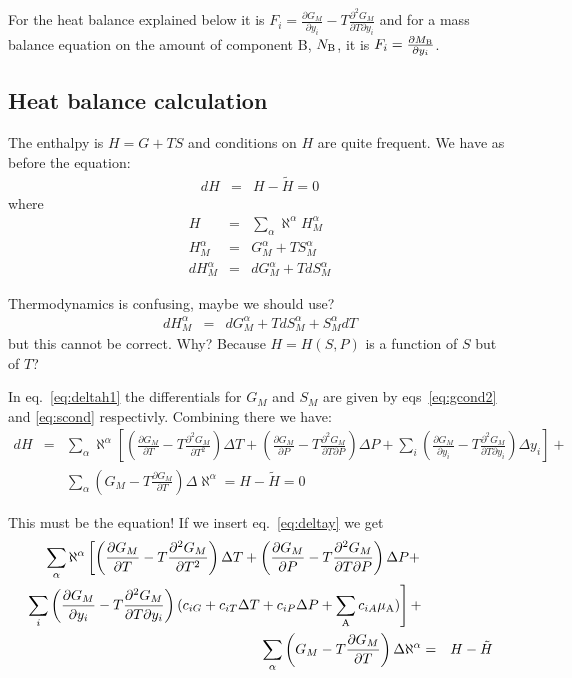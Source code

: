 \documentclass[12pt]{article}
\begin{document}
For the heat balance explained below it is $F_i = \frac{\partial
  G_M}{\partial y_i}-T\frac{\partial^2 G_M}{\partial T\partial y_i}$
and for a mass balance equation on the amount of component B, $N_{\rm
  B}$, it is $F_i = \frac{\partial M_{\rm B}}{\partial y_i}$.

\subsection{Heat balance calculation}

The enthalpy is $H=G+TS$ and conditions on $H$ are quite frequent.  We
have as before the equation:
\begin{eqnarray}
dH &=& H - \tilde H = 0
\end{eqnarray}
where
\begin{eqnarray}
H &=& \sum_{\alpha}\aleph^{\alpha} H^{\alpha}_M\\
H^{\alpha}_M &=&G^{\alpha}_M + TS^{\alpha}_M\\
dH^{\alpha}_M &=&dG^{\alpha}_M + TdS^{\alpha}_M \label{eq:deltah1}
\end{eqnarray}

Thermodynamics is confusing, maybe we should use?
\begin{eqnarray}
dH^{\alpha}_M &=&dG^{\alpha}_M + TdS^{\alpha}_M + S^{\alpha}_M dT \label{eq:deltah2}
\end{eqnarray}
but this cannot be correct. Why?  Because $H=H(S,P)$ is a function
of $S$ but of $T$?

In eq.~\ref{eq:deltah1} the differentials for $G_M$ and $S_M$ are
given by eqs~\ref{eq:gcond2} and \ref{eq:scond} respectivly.
Combining there we have:
\begin{eqnarray}
dH &=& \sum_{\alpha}\aleph^{\alpha}\left[
\left(\frac{\partial G_M}{\partial T}-T\frac{\partial^2 G_M}{\partial T^2}\right)\Delta T+ 
\left(\frac{\partial G_M}{\partial P}-T\frac{\partial^2 G_M}{\partial T\partial P}\right)\Delta P+ 
\sum_i\left(\frac{\partial G_M}{\partial y_i}-T\frac{\partial^2 G_M}{\partial T\partial y_i}\right)\Delta y_i\right]+\nonumber\\&&
\sum_{\alpha}\left(G_M - T \frac{\partial G_M}{\partial T}\right) \Delta\aleph^{\alpha} = H - \tilde H = 0 \label{eq:hcond}
\end{eqnarray}

This must be the equation!  If we insert eq.~\ref{eq:deltay} we get
\begin{eqnarray}
\sum_{\alpha}\aleph^{\alpha}\left[
\left(\frac{\partial G_M}{\partial T}-T\frac{\partial^2 G_M}{\partial T^2}\right)\Delta T+ 
\left(\frac{\partial G_M}{\partial P}-T\frac{\partial^2 G_M}{\partial T\partial P}\right)\Delta P+ \right.\nonumber&&\\
\left.\sum_i\left(\frac{\partial G_M}{\partial y_i}-T\frac{\partial^2 G_M}{\partial T\partial y_i}\right)(c_{iG} + c_{iT}\Delta T + c_{iP}\Delta P + \sum_{\rm A}c_{iA}\mu_{\rm A})\right]+\nonumber&&\\
\sum_{\alpha}\left(G_M - T \frac{\partial G_M}{\partial T}\right) \Delta\aleph^{\alpha} &=& H - \tilde H \nonumber\\\label{eq:hcond2}
\end{eqnarray}
\end{document}
